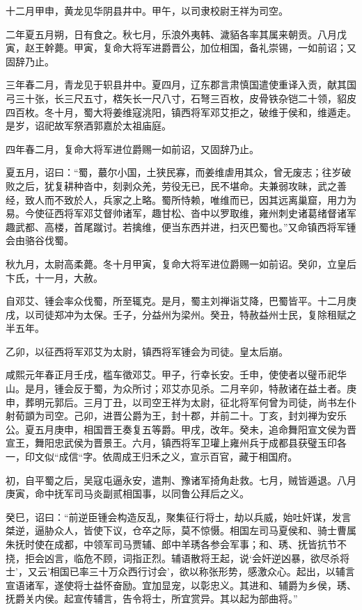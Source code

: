 \documentclass[12pt,UTF8]{ctexbook}
\begin{document}
十二月甲申，黄龙见华阴县井中。甲午，以司隶校尉王祥为司空。

二年夏五月朔，日有食之。秋七月，乐浪外夷韩、濊貊各率其属来朝贡。八月戊寅，赵王幹薨。甲寅，复命大将军进爵晋公，加位相国，备礼崇锡，一如前诏；又固辞乃止。

三年春二月，青龙见于轵县井中。夏四月，辽东郡言肃慎国遣使重译入贡，献其国弓三十张，长三尺五寸，楛矢长一尺八寸，石弩三百枚，皮骨铁杂铠二十领，貂皮四百枚。冬十月，蜀大将姜维寇洮阳，镇西将军邓艾拒之，破维于侯和，维遁走。是岁，诏祀故军祭酒郭嘉於太祖庙庭。

四年春二月，复命大将军进位爵赐一如前诏，又固辞乃止。

夏五月，诏曰：“蜀，蕞尔小国，土狭民寡，而姜维虐用其众，曾无废志；往岁破败之后，犹复耕种沓中，刻剥众羌，劳役无已，民不堪命。夫兼弱攻昧，武之善经，致人而不致於人，兵家之上略。蜀所恃赖，唯维而已，因其远离巢窟，用力为易。今使征西将军邓艾督帅诸军，趣甘松、沓中以罗取维，雍州刺史诸葛绪督诸军趣武都、高楼，首尾蹴讨。若擒维，便当东西并进，扫灭巴蜀也。”又命镇西将军锺会由骆谷伐蜀。

秋九月，太尉高柔薨。冬十月甲寅，复命大将军进位爵赐一如前诏。癸卯，立皇后卞氏，十一月，大赦。

自邓艾、锺会率众伐蜀，所至辄克。是月，蜀主刘禅诣艾降，巴蜀皆平。十二月庚戌，以司徒郑冲为太保。壬子，分益州为梁州。癸丑，特赦益州士民，复除租赋之半五年。

乙卯，以征西将军邓艾为太尉，镇西将军锺会为司徒。皇太后崩。

咸熙元年春正月壬戌，槛车徵邓艾。甲子，行幸长安。壬申，使使者以璧币祀华山。是月，锺会反于蜀，为众所讨；邓艾亦见杀。二月辛卯，特赦诸在益土者。庚申，葬明元郭后。三月丁丑，以司空王祥为太尉，征北将军何曾为司徒，尚书左仆射荀顗为司空。己卯，进晋公爵为王，封十郡，并前二十。丁亥，封刘禅为安乐公。夏五月庚申，相国晋王奏复五等爵。甲戌，改年。癸未，追命舞阳宣文侯为晋宣王，舞阳忠武侯为晋景王。六月，镇西将军卫瓘上雍州兵于成都县获璧玉印各一，印文似“成信“字。依周成王归禾之义，宣示百官，藏于相国府。

初，自平蜀之后，吴寇屯逼永安，遣荆、豫诸军掎角赴救。七月，贼皆遁退。八月庚寅，命中抚军司马炎副贰相国事，以同鲁公拜后之义。

癸巳，诏曰：“前逆臣锺会构造反乱，聚集征行将士，劫以兵威，始吐奸谋，发言桀逆，逼胁众人，皆使下议，仓卒之际，莫不惊慑。相国左司马夏侯和、骑士曹属朱抚时使在成都，中领军司马贾辅、郎中羊琇各参会军事；和、琇、抚皆抗节不挠，拒会凶言，临危不顾，词指正烈。辅语散将王起，说‘会奸逆凶暴，欲尽杀将士'，又云'相国已率三十万众西行讨会’，欲以称张形势，感激众心。起出，以辅言宣语诸军，遂使将士益怀奋励。宜加显宠，以彰忠义。其进和、辅爵为乡侯，琇、抚爵关内侯。起宣传辅言，告令将士，所宜赏异。其以起为部曲将。”
\end{document}
